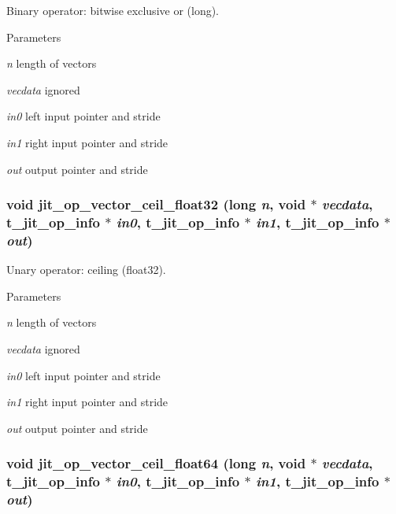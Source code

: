 Binary operator: bitwise exclusive or (long). 
\begin{DoxyParams}{Parameters}
\item[{\em n}]length of vectors \item[{\em vecdata}]ignored \item[{\em in0}]left input pointer and stride \item[{\em in1}]right input pointer and stride \item[{\em out}]output pointer and stride \end{DoxyParams}
\hypertarget{group__opvecmod_gaa3b54514a3ba3b8e6a32e7111fe1f41c}{
\subsubsection[{jit\_\-op\_\-vector\_\-ceil\_\-float32}]{\setlength{\rightskip}{0pt plus 5cm}void jit\_\-op\_\-vector\_\-ceil\_\-float32 (long {\em n}, \/  void $\ast$ {\em vecdata}, \/  {\bf t\_\-jit\_\-op\_\-info} $\ast$ {\em in0}, \/  {\bf t\_\-jit\_\-op\_\-info} $\ast$ {\em in1}, \/  {\bf t\_\-jit\_\-op\_\-info} $\ast$ {\em out})}}
\label{group__opvecmod_gaa3b54514a3ba3b8e6a32e7111fe1f41c}


Unary operator: ceiling (float32). 
\begin{DoxyParams}{Parameters}
\item[{\em n}]length of vectors \item[{\em vecdata}]ignored \item[{\em in0}]left input pointer and stride \item[{\em in1}]right input pointer and stride \item[{\em out}]output pointer and stride \end{DoxyParams}
\hypertarget{group__opvecmod_gaeb31ea93e3970f6ee34a46b9e89c294d}{
\subsubsection[{jit\_\-op\_\-vector\_\-ceil\_\-float64}]{\setlength{\rightskip}{0pt plus 5cm}void jit\_\-op\_\-vector\_\-ceil\_\-float64 (long {\em n}, \/  void $\ast$ {\em vecdata}, \/  {\bf t\_\-jit\_\-op\_\-info} $\ast$ {\em in0}, \/  {\bf t\_\-jit\_\-op\_\-info} $\ast$ {\em in1}, \/  {\bf t\_\-jit\_\-op\_\-info} $\ast$ {\em out})}}
\label{group__opvecmod_gaeb31ea93e3970f6ee34a46b9e89c294d}


